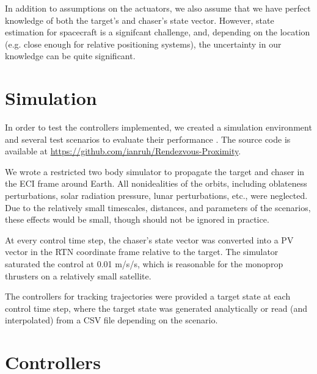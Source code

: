 \documentclass[conference]{IEEEtran}
\begin{document}
In addition to assumptions on the actuators, we also assume that we have
perfect knowledge of both the target's and chaser's state vector. However,
state estimation for spacecraft is a signifcant challenge, and, depending on
the location (e.g. close enough for relative positioning systems), the uncertainty
in our knowledge can be quite significant.


\section{Simulation}

In order to test the controllers implemented, we created a simulation environment
and several test scenarios to evaluate their performance \cite{rpo_repo}. The
source code is available at
\url{https://github.com/ianruh/Rendezvous-Proximity}.

We wrote a restricted two body simulator to propagate the target and chaser
in the ECI frame around Earth. All nonidealities of the orbits, including
oblateness perturbations, solar radiation pressure, lunar perturbations, etc.,
were neglected. Due to the relatively small timescales, distances, and
parameters of the scenarios, these effects would be small, though should not be
ignored in practice.

At every control time step, the chaser's state vector was
converted into a PV vector in the RTN coordinate frame relative to the target.
The simulator saturated the control at 0.01 m/s/s, which is reasonable for the monoprop
thrusters on a relatively small satellite.

The controllers for tracking trajectories were provided a target state at each
control time step, where the target state was generated analytically or read
(and interpolated) from a CSV file depending on the scenario.


\section{Controllers}
\end{document}
